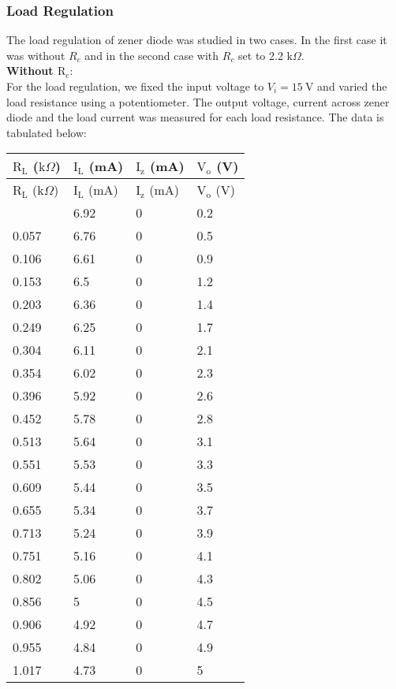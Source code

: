 \documentclass[12pt]{article}
\begin{document}
\subsubsection{Load Regulation}
The load regulation of zener diode was studied in two cases. In the first case it was without $R_c$ and in the second case with $R_c$ set to 2.2 $\text{k}\Omega$.\\[0.3cm]
\textbf{Without $\mathrm{R_c}:$ }\\[0.3cm]
For the load regulation, we fixed the input voltage to $V_i = 15 \ \mathrm{V}$ and varied the load resistance using a potentiometer. The output voltage, current across zener diode and the load current was measured for each load resistance. The data is tabulated below:
\begin{longtable}{|l|l|l|l|}
\hline
$\mathrm{R_L}$ ($\mathrm{k}\Omega$) & $\mathrm{I_L}$ (mA) & $\text{I}_\text{z}$ (mA) & $\mathrm{V_o}$ (V) \\ \hline \hline
\endfirsthead
\hline
$\mathrm{R_L}$ ($\mathrm{k}\Omega$) & $\mathrm{I_L}$ (mA) & $\text{I}_\text{z}$  (mA) & $\mathrm{V_o}$ (V) \\ \hline \hline
\endhead
\hline
\endfoot
\hline
\endlastfoot
0.007       & 6.92      & 0       & 0.2       \\ \hline
0.057       & 6.76      & 0       & 0.5       \\ \hline
0.106       & 6.61      & 0       & 0.9       \\ \hline
0.153       & 6.5       & 0       & 1.2       \\ \hline
0.203       & 6.36      & 0       & 1.4       \\ \hline
0.249       & 6.25      & 0       & 1.7       \\ \hline
0.304       & 6.11      & 0       & 2.1       \\ \hline
0.354       & 6.02      & 0       & 2.3       \\ \hline
0.396       & 5.92      & 0       & 2.6       \\ \hline
0.452       & 5.78      & 0       & 2.8       \\ \hline
0.513       & 5.64      & 0       & 3.1       \\ \hline
0.551       & 5.53      & 0       & 3.3       \\ \hline
0.609       & 5.44      & 0       & 3.5       \\ \hline
0.655       & 5.34      & 0       & 3.7       \\ \hline
0.713       & 5.24      & 0       & 3.9       \\ \hline
0.751       & 5.16      & 0       & 4.1       \\ \hline
0.802       & 5.06      & 0       & 4.3       \\ \hline
0.856       & 5         & 0       & 4.5       \\ \hline
0.906       & 4.92      & 0       & 4.7       \\ \hline
0.955       & 4.84      & 0       & 4.9       \\ \hline
1.017       & 4.73      & 0       & 5         \\ \hline
\end{longtable}
\end{document}
